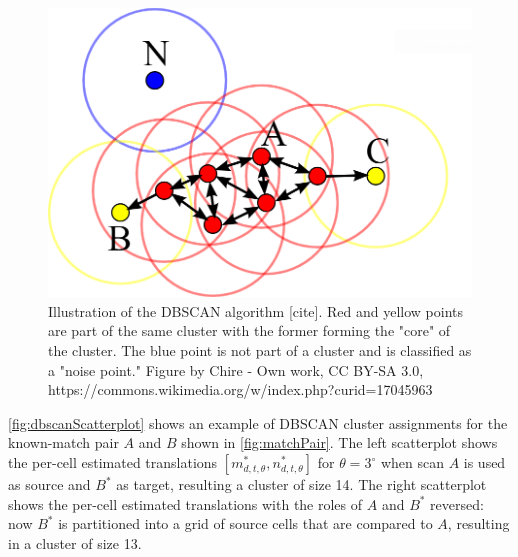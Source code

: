 \documentclass[
]{jdssv}
\begin{document}
\begin{CodeChunk}
\begin{figure}[htbp]

{\centering \includegraphics[width=.7\textwidth]{images/dbscanIllustration} 

}

\caption{\label{fig:dbscanIllustration} Illustration of the DBSCAN algorithm [cite]. Red and yellow points are part of the same cluster with the former forming the "core" of the cluster. The blue point is not part of a cluster and is classified as a "noise point." Figure by Chire - Own work, CC BY-SA 3.0, https://commons.wikimedia.org/w/index.php?curid=17045963}\label{fig:unnamed-chunk-12}
\end{figure}
\end{CodeChunk}

\autoref{fig:dbscanScatterplot} shows an example of DBSCAN cluster
assignments for the known-match pair \(A\) and \(B\) shown in
\autoref{fig:matchPair}. The left scatterplot shows the per-cell
estimated translations \([m^*_{d,t,\theta}, n^*_{d,t,\theta}]\) for
\(\theta = 3^\circ\) when scan \(A\) is used as source and \(B^*\) as
target, resulting a cluster of size 14. The right scatterplot shows the
per-cell estimated translations with the roles of \(A\) and \(B^*\)
reversed: now \(B^*\) is partitioned into a grid of source cells that
are compared to \(A\), resulting in a cluster of size 13.
\end{document}
